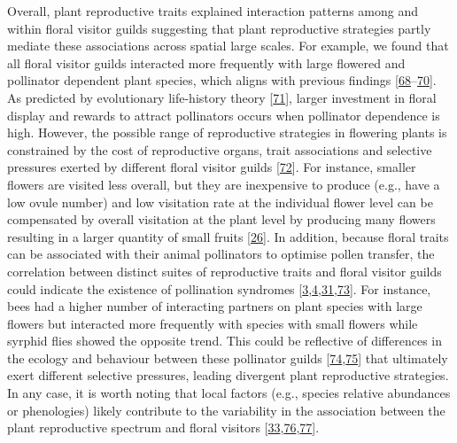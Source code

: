 \documentclass[
  12pt,
  a4paper,
]{article}
\begin{document}
Overall, plant reproductive traits explained interaction patterns among and within floral visitor guilds suggesting that plant reproductive strategies partly mediate these associations across spatial large scales. For example, we found that all floral visitor guilds interacted more frequently with large flowered and pollinator dependent plant species, which aligns with previous findings {[}\protect\hyperlink{ref-hegland2005}{68}--\protect\hyperlink{ref-kaiser2014}{70}{]}. As predicted by evolutionary life-history theory {[}\protect\hyperlink{ref-stebbins1970}{71}{]}, larger investment in floral display and rewards to attract pollinators occurs when pollinator dependence is high. However, the possible range of reproductive strategies in flowering plants is constrained by the cost of reproductive organs, trait associations and selective pressures exerted by different floral visitor guilds {[}\protect\hyperlink{ref-galen1999}{72}{]}. For instance, smaller flowers are visited less overall, but they are inexpensive to produce (e.g., have a low ovule number) and low visitation rate at the individual flower level can be compensated by overall visitation at the plant level by producing many flowers resulting in a larger quantity of small fruits {[}\protect\hyperlink{ref-kettle2011}{26}{]}. In addition, because floral traits can be associated with their animal pollinators to optimise pollen transfer, the correlation between distinct suites of reproductive traits and floral visitor guilds could indicate the existence of pollination syndromes {[}\protect\hyperlink{ref-fenster2004}{3},\protect\hyperlink{ref-dellinger2020}{4},\protect\hyperlink{ref-rosas2014}{31},\protect\hyperlink{ref-faegri2013}{73}{]}. For instance, bees had a higher number of interacting partners on plant species with large flowers but interacted more frequently with species with small flowers while syrphid flies showed the opposite trend. This could be reflective of differences in the ecology and behaviour between these pollinator guilds {[}\protect\hyperlink{ref-rader2020}{74},\protect\hyperlink{ref-foldesi2021}{75}{]} that ultimately exert different selective pressures, leading divergent plant reproductive strategies. In any case, it is worth noting that local factors (e.g., species relative abundances or phenologies) likely contribute to the variability in the association between the plant reproductive spectrum and floral visitors {[}\protect\hyperlink{ref-bartomeus2016}{33},\protect\hyperlink{ref-vazquez2007}{76},\protect\hyperlink{ref-encinas2012}{77}{]}.
\end{document}
